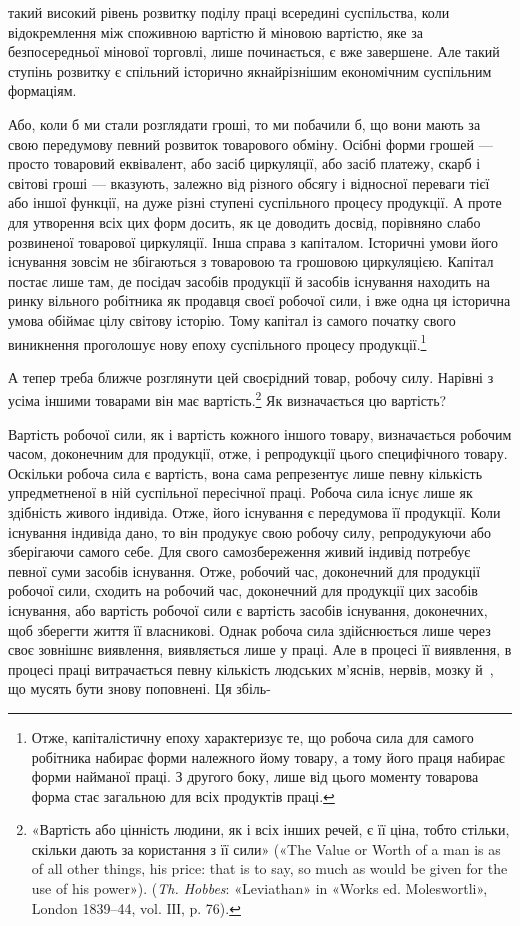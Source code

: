\parcont{}  %
такий високий рівень розвитку поділу праці всередині суспільства,
коли відокремлення між споживною вартістю й міновою
вартістю, яке за безпосередньої мінової торговлі, лише починається,
є вже завершене. Але такий ступінь розвитку є спільний
історично якнайрізнішим економічним суспільним формаціям.

Або, коли б ми стали розглядати гроші, то ми побачили б,
що вони мають за свою передумову певний розвиток товарового
обміну. Осібні форми грошей — просто товаровий еквівалент,
або засіб циркуляції, або засіб платежу, скарб і світові гроші —
вказують, залежно від різного обсягу і відносної переваги тієї
або іншої функції, на дуже різні ступені суспільного процесу
продукції. А проте для утворення всіх цих форм досить, як це
доводить досвід, порівняно слабо розвиненої товарової циркуляції.
Інша справа з капіталом. Історичні умови його існування зовсім
не збігаються з товаровою та грошовою циркуляцією. Капітал
постає лише там, де посідач засобів продукції й засобів існування
находить на ринку вільного робітника як продавця своєї робочої
сили, і вже одна ця історична умова обіймає цілу світову історію.
Тому капітал із самого початку свого виникнення проголошує
нову епоху суспільного процесу продукції.\footnote{
Отже, капіталістичну епоху характеризує те, що робоча сила для
самого робітника набирає форми належного йому товару, а тому його
праця набирає форми найманої праці. З другого боку, лише від цього моменту
товарова форма стає загальною для всіх продуктів праці.
}

А тепер треба ближче розглянути цей своєрідний товар, робочу
силу. Нарівні з усіма іншими товарами він має вартість.\footnote{
«Вартість або цінність людини, як і всіх інших речей, є її ціна,
тобто стільки, скільки дають за користання з її сили» («The Value or
Worth of a man is as of all other things, his price: that is to say, so much
as would be given for the use of his power»). (\emph{Th. Hobbes}: «Leviathan»
in «Works ed. Moleswortli», London 1839--44, vol. IІІ, p. 76).
} Як
визначається цю вартість?

Вартість робочої сили, як і вартість кожного іншого товару,
визначається робочим часом, доконечним для продукції, отже,
і репродукції цього специфічного товару. Оскільки робоча сила
є вартість, вона сама репрезентує лише певну кількість упредметненої
в ній суспільної пересічної праці. Робоча сила існує
лише як здібність живого індивіда. Отже, його існування є передумова
її продукції. Коли існування індивіда дано, то він продукує
свою робочу силу, репродукуючи або зберігаючи самого себе.
Для свого самозбереження живий індивід потребує певної суми
засобів існування. Отже, робочий час, доконечний для продукції
робочої сили, сходить на робочий час, доконечний для продукції
цих засобів існування, або вартість робочої сили є вартість засобів
існування, доконечних, щоб зберегти життя її власникові.
Однак робоча сила здійснюється лише через своє зовнішнє виявлення,
виявляється лише у праці. Але в процесі її виявлення,
в процесі праці витрачається певну кількість людських м’яснів,
нервів, мозку й~, що мусять бути знову поповнені. Ця збіль-
\parbreak{}  %
